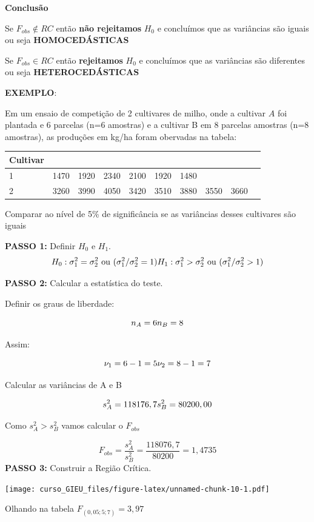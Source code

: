 \documentclass[
]{book}
\begin{document}
\textbf{Conclusão}

Se \(F_{obs} \not\in RC\) então \textbf{não rejeitamos} \(H_0\) e concluímos que as variâncias são iguais ou seja \textbf{HOMOCEDÁSTICAS}

Se \(F_{obs} \in RC\) então \textbf{rejeitamos} \(H_0\) e concluímos que as variâncias são diferentes ou seja \textbf{HETEROCEDÁSTICAS}

\textbf{EXEMPLO}:

Em um ensaio de competição de 2 cultivares de milho, onde a cultivar \(A\) foi plantada e 6 parcelas (n=6 amostras) e a cultivar B em 8 parcelas amostras (n=8 amostras), as produções em kg/ha foram obervadas na tabela:

\begin{longtable}[]{@{}llllllllll@{}}
\toprule
Cultivar & & & & & & & & &\tabularnewline
\midrule
\endhead
1 & 1470 & 1920 & 2340 & 2100 & 1920 & 1480 & & &\tabularnewline
2 & 3260 & 3990 & 4050 & 3420 & 3510 & 3880 & 3550 & 3660 &\tabularnewline
\bottomrule
\end{longtable}

Comparar ao nível de 5\% de significância se as variâncias desses cultivares são iguais

\textbf{PASSO 1:} Definir \(H_0\) e \(H_1\).
\[
H_0: \sigma_1^2 = \sigma_2^2 \text{   ou   } (\sigma_1^2 /\sigma_2^2 =1) \\
H_1: \sigma_1^2 > \sigma_2^2 \text{   ou   } (\sigma_1^2 /\sigma_2^2 > 1)
\]

\textbf{PASSO 2:} Calcular a estatística do teste.

Definir os graus de liberdade:

\[
n_A = 6 \\
n_B = 8
\]

Assim:

\[
\nu_1 = 6 - 1 = 5 \\
\nu_2 = 8 - 1 = 7 \\
\]

Calcular as variâncias de A e B

\[
s_A^2 = 118176,7 \\
s_B^2 = 80200,00 
\]

Como \(s^2_A > s^2_B\) vamos calcular o \(F_{obs}\)

\[
F_{obs} = \frac{s^2_A}{s^2_B} = \frac{118076,7}{80200}=1,4735
\]
\textbf{PASSO 3:} Construir a Região Crítica.

\texttt{[image: curso\_GIEU\_files/figure-latex/unnamed-chunk-10-1.pdf]}

Olhando na tabela \(F_{(0,05; 5; 7)} = 3,97\)
\end{document}
